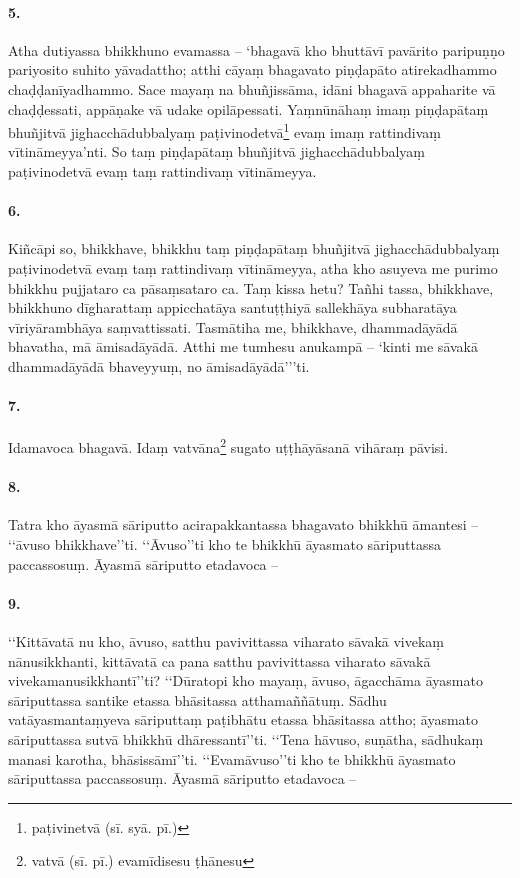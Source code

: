\paragraph{5.} Atha dutiyassa bhikkhuno evamassa – ‘bhagavā kho bhuttāvī pavārito paripuṇṇo pariyosito suhito yāvadattho; atthi cāyaṃ bhagavato piṇḍapāto atirekadhammo chaḍḍanīyadhammo. Sace mayaṃ na bhuñjissāma, idāni bhagavā appaharite vā chaḍḍessati, appāṇake vā udake opilāpessati. Yaṃnūnāhaṃ imaṃ piṇḍapātaṃ bhuñjitvā jighacchādubbalyaṃ paṭivinodetvā\footnote{paṭivinetvā (sī. syā. pī.)} evaṃ imaṃ rattindivaṃ vītināmeyya’nti. So taṃ piṇḍapātaṃ bhuñjitvā jighacchādubbalyaṃ paṭivinodetvā evaṃ taṃ rattindivaṃ vītināmeyya.

\paragraph{6.} Kiñcāpi so, bhikkhave, bhikkhu taṃ piṇḍapātaṃ bhuñjitvā jighacchādubbalyaṃ paṭivinodetvā evaṃ taṃ rattindivaṃ vītināmeyya, atha kho asuyeva me purimo bhikkhu pujjataro ca pāsaṃsataro ca. Taṃ kissa hetu? Tañhi tassa, bhikkhave, bhikkhuno dīgharattaṃ appicchatāya santuṭṭhiyā sallekhāya subharatāya vīriyārambhāya saṃvattissati. Tasmātiha me, bhikkhave, dhammadāyādā bhavatha, mā āmisadāyādā. Atthi me tumhesu anukampā – ‘kinti me sāvakā dhammadāyādā bhaveyyuṃ, no āmisadāyādā’’’ti.

\paragraph{7.} Idamavoca bhagavā. Idaṃ vatvāna\footnote{vatvā (sī. pī.) evamīdisesu ṭhānesu} sugato uṭṭhāyāsanā vihāraṃ pāvisi.

\paragraph{8.} Tatra kho āyasmā sāriputto acirapakkantassa bhagavato bhikkhū āmantesi – ‘‘āvuso bhikkhave’’ti. ‘‘Āvuso’’ti kho te bhikkhū āyasmato sāriputtassa paccassosuṃ. Āyasmā sāriputto etadavoca –

\paragraph{9.} ‘‘Kittāvatā nu kho, āvuso, satthu pavivittassa viharato sāvakā vivekaṃ nānusikkhanti, kittāvatā ca pana satthu pavivittassa viharato sāvakā vivekamanusikkhantī’’ti? ‘‘Dūratopi kho mayaṃ, āvuso, āgacchāma āyasmato sāriputtassa santike etassa bhāsitassa atthamaññātuṃ. Sādhu vatāyasmantaṃyeva sāriputtaṃ paṭibhātu etassa bhāsitassa attho; āyasmato sāriputtassa sutvā bhikkhū dhāressantī’’ti. ‘‘Tena hāvuso, suṇātha, sādhukaṃ manasi karotha, bhāsissāmī’’ti. ‘‘Evamāvuso’’ti kho te bhikkhū āyasmato sāriputtassa paccassosuṃ. Āyasmā sāriputto etadavoca –

